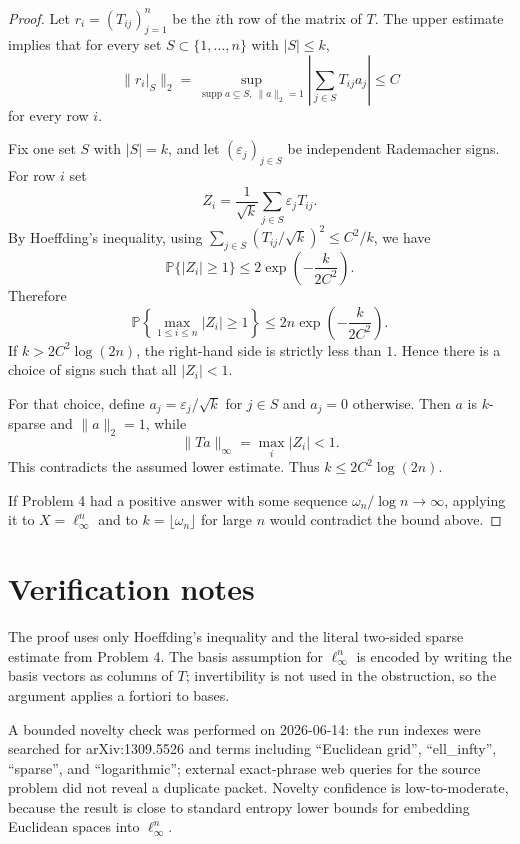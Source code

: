 \documentclass[11pt]{article}
\begin{document}
\begin{proof}
Let $r_i=(T_{ij})_{j=1}^n$ be the $i$th row of the matrix of $T$.  The upper
estimate implies that for every set $S\subset\{1,\ldots,n\}$ with
$|S|\leq k$,
\[
  \|r_i|_S\|_2
  =
  \sup_{\operatorname{supp} a\subseteq S,\ \|a\|_2=1}
  \left|\sum_{j\in S} T_{ij}a_j\right|
  \leq C
\]
for every row $i$.

Fix one set $S$ with $|S|=k$, and let $(\varepsilon_j)_{j\in S}$ be
independent Rademacher signs.  For row $i$ set
\[
  Z_i=\frac{1}{\sqrt{k}}\sum_{j\in S}\varepsilon_j T_{ij}.
\]
By Hoeffding's inequality, using
$\sum_{j\in S}(T_{ij}/\sqrt{k})^2\leq C^2/k$, we have
\[
  \mathbb P\{|Z_i|\geq 1\}
  \leq
  2\exp\left(-\frac{k}{2C^2}\right).
\]
Therefore
\[
  \mathbb P\left\{\max_{1\leq i\leq n}|Z_i|\geq 1\right\}
  \leq
  2n\exp\left(-\frac{k}{2C^2}\right).
\]
If $k>2C^2\log(2n)$, the right-hand side is strictly less than $1$.  Hence
there is a choice of signs such that all $|Z_i|<1$.

For that choice, define $a_j=\varepsilon_j/\sqrt{k}$ for $j\in S$ and
$a_j=0$ otherwise.  Then $a$ is $k$-sparse and $\|a\|_2=1$, while
\[
  \|Ta\|_\infty=\max_i |Z_i|<1.
\]
This contradicts the assumed lower estimate.  Thus
$k\leq 2C^2\log(2n)$.

If Problem 4 had a positive answer with some sequence
$\omega_n/\log n\to\infty$, applying it to $X=\ell_\infty^n$ and to
$k=\lfloor \omega_n\rfloor$ for large $n$ would contradict the bound above.
\end{proof}

\section*{Verification notes}

The proof uses only Hoeffding's inequality and the literal two-sided sparse
estimate from Problem 4.  The basis assumption for $\ell_\infty^n$ is encoded
by writing the basis vectors as columns of $T$; invertibility is not used in
the obstruction, so the argument applies a fortiori to bases.

A bounded novelty check was performed on 2026-06-14: the run indexes were
searched for arXiv:1309.5526 and terms including ``Euclidean grid'',
``ell\_infty'', ``sparse'', and ``logarithmic''; external exact-phrase web
queries for the source problem did not reveal a duplicate packet.  Novelty
confidence is low-to-moderate, because the result is close to standard
entropy lower bounds for embedding Euclidean spaces into $\ell_\infty^n$.
\end{document}
